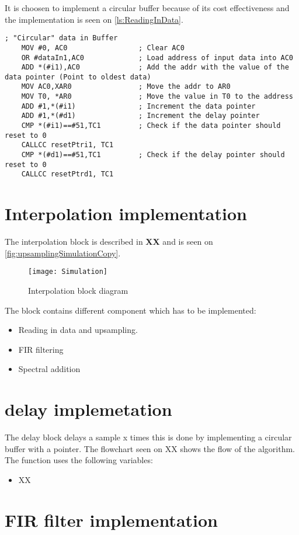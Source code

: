 It is choosen to implement a circular buffer because of its cost effectiveness and the implementation is seen on \autoref{ls:ReadingInData}.
\begin{lstlisting}[language={[x86masm]Assembler}, caption = {Reading data in},label={ls:ReadingInData}]
	; "Circular" data in Buffer
	MOV #0, AC0					; Clear AC0
	OR #dataIn1,AC0				; Load address of input data into AC0
	ADD *(#i1),AC0				; Add the addr with the value of the data pointer (Point to oldest data)
	MOV AC0,XAR0				; Move the addr to AR0
	MOV T0, *AR0				; Move the value in T0 to the address
	ADD #1,*(#i1)				; Increment the data pointer
	ADD #1,*(#d1)				; Increment the delay pointer
	CMP *(#i1)==#51,TC1			; Check if the data pointer should reset to 0
	CALLCC resetPtri1, TC1
	CMP *(#d1)==#51,TC1			; Check if the delay pointer should reset to 0
	CALLCC resetPtrd1, TC1
\end{lstlisting}





\section{Interpolation implementation}
The interpolation block is described in \textbf{XX} and is seen on \autoref{fig:upsamplingSimulationCopy}.
\begin{figure}[H]
    \centering
	\texttt{[image: Simulation]}
    \caption{Interpolation block diagram}
    \label{fig:upsamplingSimulationCopy}
\end{figure}
The block contains different component which has to be implemented:
\begin{itemize}
\item Reading in data and upsampling.
\item FIR filtering
\item Spectral addition
\end{itemize}


\section{delay implemetation}
The delay block delays a sample x times this is done by implementing a circular buffer with a pointer. The flowchart seen on XX shows the flow of the algorithm.
The function uses the following variables:
\begin{itemize}
\item XX
\end{itemize}


\section{FIR filter implementation}